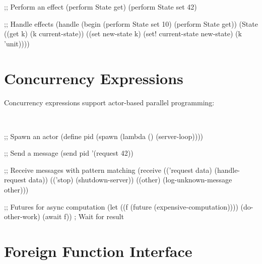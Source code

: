 \begin{example}
\begin{lambdustcode}
;; Perform an effect
(perform State get)
(perform State set 42)

;; Handle effects
(handle 
  (begin 
    (perform State set 10)
    (perform State get))
  (State 
    ((get k) (k current-state))
    ((set new-state k) 
     (set! current-state new-state)
     (k 'unit))))
\end{lambdustcode}
\end{example}

\section{Concurrency Expressions}
\label{sec:concurrency-expressions}


Concurrency expressions support actor-based parallel programming:

\begin{grammar}
\\
\end{grammar}

\begin{example}
\begin{lambdustcode}
;; Spawn an actor
(define pid (spawn (lambda () (server-loop))))

;; Send a message
(send pid '(request 42))

;; Receive messages with pattern matching
(receive
  (('request data) 
   (handle-request data))
  (('stop)
   (shutdown-server))
  ((other) 
   (log-unknown-message other)))

;; Futures for async computation
(let ((f (future (expensive-computation))))
  (do-other-work)
  (await f))    ; Wait for result
\end{lambdustcode}
\end{example}

\section{Foreign Function Interface}
\label{sec:foreign-syntax}

